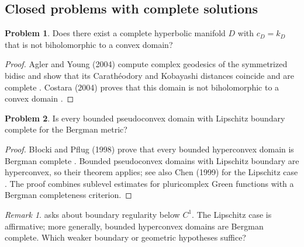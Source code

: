 \documentclass[11pt,reqno]{amsart}
\theoremstyle{definition}
\newtheorem{problem}{Problem}[section]
\theoremstyle{remark}
\newtheorem*{remark}{Remark}
\begin{document}
\subsection{Closed problems with complete solutions}

\begin{problem}\label{b95-7-5-5}
Does there exist a complete hyperbolic manifold $D$ with $c_D=k_D$ that is not biholomorphic to a convex domain?
\end{problem}
\begin{proof}
Agler and Young (2004) compute complex geodesics of the symmetrized bidisc and show that its Carath\'eodory and Kobayashi distances coincide and are complete \cite{B95-AY}. Costara (2004) proves that this domain is not biholomorphic to a convex domain \cite{B95-Costara}.
\end{proof}

\begin{problem}\label{b95-7-2-1}
Is every bounded pseudoconvex domain with Lipschitz boundary complete for the Bergman metric?
\end{problem}
\begin{proof}
B{\l}ocki and Pflug (1998) prove that every bounded hyperconvex domain is Bergman complete \cite{B95-BP}. Bounded pseudoconvex domains with Lipschitz boundary are hyperconvex, so their theorem applies; see also Chen (1999) for the Lipschitz case \cite{B95-Chen1999}. The proof combines sublevel estimates for pluricomplex Green functions with a Bergman completeness criterion.
\end{proof}
\begin{remark}
\cite[Problem~7.2.1]{B95} asks about boundary regularity below $C^1$. The Lipschitz case is affirmative; more generally, bounded hyperconvex domains are Bergman complete. Which weaker boundary or geometric hypotheses suffice?
\end{remark}
\end{document}
